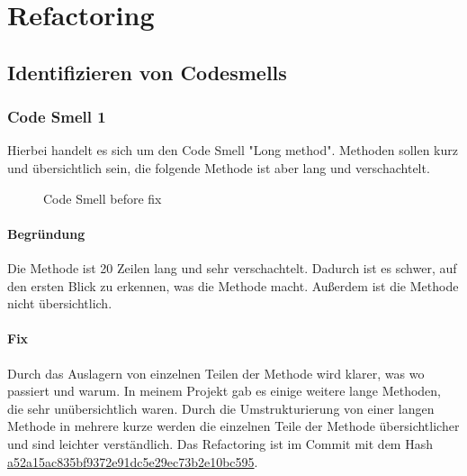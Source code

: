 
\chapter{Refactoring}
\label{refactoring}

\section{Identifizieren von Codesmells}

    \subsection{Code Smell 1}
    Hierbei handelt es sich um den Code Smell "Long method". Methoden sollen kurz und übersichtlich sein, die folgende Methode ist aber lang und verschachtelt.
    
    \begin{figure}[h]
	    \centering
	    \caption{Code Smell  before fix}
    \end{figure}
    
    
        \subsubsection{Begründung}
        Die Methode ist 20 Zeilen lang und sehr verschachtelt. Dadurch ist es schwer, auf den ersten Blick zu erkennen, was die Methode macht. Außerdem ist die Methode nicht übersichtlich.

        \subsubsection{Fix}
        Durch das Auslagern von einzelnen Teilen der Methode wird klarer, was wo passiert und warum. In meinem Projekt gab es einige weitere lange Methoden, die sehr unübersichtlich waren. Durch die Umstrukturierung von einer langen Methode in mehrere kurze werden die einzelnen Teile der Methode übersichtlicher und sind leichter verständlich. Das Refactoring ist im Commit mit dem Hash \href{https://github.com/Krissi005/seriephant/commit/a52a15ac835bf9372e91dc5e29ec73b2e10bc595}{a52a15ac835bf9372e91dc5e29ec73b2e10bc595}.
    
